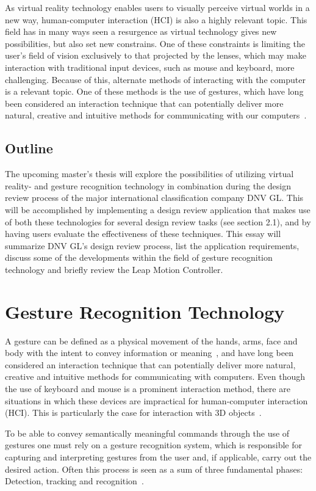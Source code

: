 \documentclass[UKenglish]{ifimaster}
\begin{document}
As virtual reality technology enables users to visually perceive virtual worlds in a new way, human-computer interaction (HCI) is also a highly relevant topic. This field has in many ways seen a resurgence as virtual technology gives new possibilities, but also set new constrains. One of these constraints is limiting the user's field of vision exclusively to that projected by the lenses, which may make interaction with traditional input devices, such as mouse and keyboard, more challenging. Because of this, alternate methods of interacting with the computer is a relevant topic. One of these methods is the use of gestures, which have long been considered an interaction technique that can potentially deliver more natural, creative and intuitive methods for communicating with our computers~\citep{Rautaray2015}. 

\section{Outline}
The upcoming master's thesis will explore the possibilities of utilizing virtual reality- and gesture recognition technology in combination during the design review process of the major international classification company DNV GL. This will be accomplished by implementing a design review application that makes use of both these technologies for several design review tasks (see section 2.1), and by having users evaluate the effectiveness of these techniques. This essay will summarize DNV GL's design review process, list the application requirements, discuss some of the developments within the field of gesture recognition technology and briefly review the Leap Motion Controller.


\chapter{Gesture Recognition Technology}
A gesture can be defined as a physical movement of the hands, arms, face and body with the intent to convey information or meaning~\citep{Mitra2007}, and have long been considered an interaction technique that can potentially deliver more natural, creative and intuitive methods for communicating with computers. Even though
the use of keyboard and mouse is a prominent interaction method, there are situations in which
these devices are impractical for human-computer interaction (HCI). This is particularly the case for interaction with 3D objects~\citep{Rautaray2015}. 

To be able to convey semantically meaningful commands through the use of gestures one must rely on a gesture recognition system, which is responsible for capturing and interpreting gestures from the user and, if applicable, carry out the desired action. Often this process is seen as a sum of three fundamental phases: Detection, tracking and recognition~\citep{Rautaray2015}.
\end{document}
